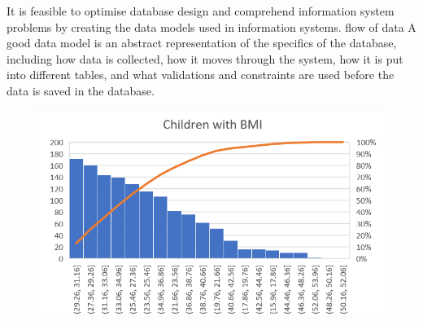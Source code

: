 \documentclass[journal]{IEEEtran}
\begin{document}
It is feasible to optimise database design and comprehend information system problems by creating the data models used in information systems. flow of data A good data model is an abstract representation of the specifics of the database, including how data is collected, how it moves through the system, how it is put into different tables, and what validations and constraints are used before the data is saved in the database.


  \begin{figure}[h]
  \centering
  \includegraphics [width= 3.55 in]{9.png}
\caption{}
  \label{storage}
\end{figure}
\end{document}
